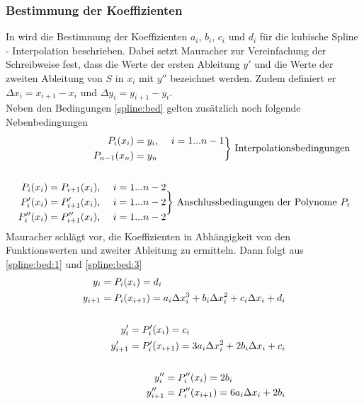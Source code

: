 \subsubsection{Bestimmung der Koeffizienten}
In \cite[Seite 157]{Mauracher1996} wird die Bestimmung der Koeffizienten $a_i$, $b_i$, $c_i$ und $d_i$ für die kubische Spline - Interpolation beschrieben. Dabei setzt Mauracher zur Vereinfachung der Schreibweise fest, dass die Werte der ersten Ableitung $y'$ und die Werte der zweiten Ableitung von $S$ in $x_i$ mit $y''$ bezeichnet werden. Zudem definiert er $\Delta x_i = x_{i+1} - x_{i}$ und $\Delta y_i = y_{i+1} - y_{i}$. \\
Neben den Bedingungen \ref{spline:bed} gelten zusätzlich noch folgende Nebenbedingungen
\begin{align}
\begin{split}
P_i(x_i) &= y_i \text{, } \quad i =1...n-1 \\ 
P_{n-1}(x_n) &= y_n 
\end{split}  \bigg\} \text{ Interpolationsbedingungen}\\\notag\\
\begin{split}
P_i(x_i) &= P_{i+1}(x_i) \text{, } \quad i =1...n-2 \\
P'_i(x_i) &= P'_{i+1}(x_i) \text{, } \quad i =1...n-2  \\
P''_i(x_i) &= P''_{i+1}(x_i) \text{, } \quad i =1...n-2  
\end{split}\bigg\}\text{ Anschlussbedingungen der Polynome } P_i \label{spline:bed:intp}
\end{align}
Mauracher schlägt vor, die Koeffizienten in Abhängigkeit von den Funktionswerten und zweiter Ableitung zu ermitteln. Dann folgt aus \ref{spline:bed:1} und \ref{spline:bed:3}
\begin{align}
\begin{split}
	  y_i &= P_i(x_i) = d_i  \\
	 y_{i+1} &= P_i(x_{i+1}) = a_i \Delta x_i^3 + b_i \Delta x_i^2 + c_i \Delta x_i  + d_i 
\end{split} \label{spline:bed:1}  \\\notag\\
\begin{split}
	y_i' &= P_i'(x_i) = c_i\\
	y_{i+1}' &= P_i'(x_{i+1}) = 3 a_i \Delta x_i^2 + 2 b_i \Delta x_i + c_i 
\end{split} \label{spline:bed:2} \\\notag\\
\begin{split}
	y_i'' &= P_i''(x_i) = 2 b_i\\
	y_{i+1}'' &= P_i''(x_{i+1}) = 6 a_i \Delta x_i + 2 b_i  
\end{split} \label{spline:bed:3}
\end{align}

